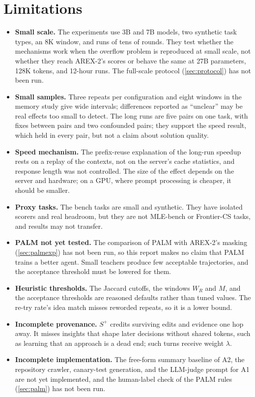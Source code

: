 \documentclass[11pt]{article}
\newcommand{\splus}{S^{+}}
\begin{document}
\section{Limitations}
\label{sec:limitations}

\begin{itemize}
  \item \textbf{Small scale.} The experiments use 3B and 7B models, two synthetic task types, an 8K window, and runs of tens of rounds. They test whether the mechanisms work when the overflow problem is reproduced at small scale, not whether they reach AREX-2's scores or behave the same at 27B parameters, 128K tokens, and 12-hour runs. The full-scale protocol (\cref{sec:protocol}) has not been run.
  \item \textbf{Small samples.} Three repeats per configuration and eight windows in the memory study give wide intervals; differences reported as ``unclear'' may be real effects too small to detect. The long runs are five pairs on one task, with fixes between pairs and two confounded pairs; they support the speed result, which held in every pair, but not a claim about solution quality.
  \item \textbf{Speed mechanism.} The prefix-reuse explanation of the long-run speedup rests on a replay of the contexts, not on the server's cache statistics, and response length was not controlled. The size of the effect depends on the server and hardware; on a GPU, where prompt processing is cheaper, it should be smaller.
  \item \textbf{Proxy tasks.} The bench tasks are small and synthetic. They have isolated scorers and real headroom, but they are not MLE-bench or Frontier-CS tasks, and results may not transfer.
  \item \textbf{PALM not yet tested.} The comparison of PALM with AREX-2's masking (\cref{sec:palmexp}) has not been run, so this report makes no claim that PALM trains a better agent. Small teachers produce few acceptable trajectories, and the acceptance threshold must be lowered for them.
  \item \textbf{Heuristic thresholds.} The Jaccard cutoffs, the windows $W_R$ and $M$, and the acceptance thresholds are reasoned defaults rather than tuned values. The re-try rate's idea match misses reworded repeats, so it is a lower bound.
  \item \textbf{Incomplete provenance.} $\splus$ credits surviving edits and evidence one hop away. It misses insights that shape later decisions without shared tokens, such as learning that an approach is a dead end; such turns receive weight $\lambda$.
  \item \textbf{Incomplete implementation.} The free-form summary baseline of A2, the repository crawler, canary-test generation, and the LLM-judge prompt for A1 are not yet implemented, and the human-label check of the PALM rules (\cref{sec:palm}) has not been run.
\end{itemize}
\end{document}

